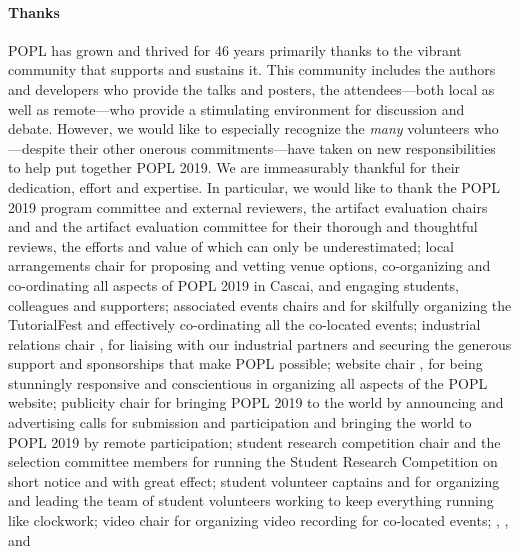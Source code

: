 \paragraph{Thanks}
%
POPL has grown and thrived for 46 years primarily thanks to
the vibrant community that supports and sustains it.
%
This community includes the authors and developers who
provide the talks and posters, the attendees---both local
as well as remote---who provide a stimulating environment
for discussion and debate.
%
However, we would like to especially recognize the \emph{many}
volunteers who---despite their other onerous commitments---have
taken on new responsibilities to help put together POPL 2019.
%
We are immeasurably thankful for their dedication, effort and expertise.
%
In particular, we would like to thank
%
the POPL 2019 program committee and external reviewers, 
%
the artifact evaluation chairs  and   
and the artifact evaluation committee for their
thorough and thoughtful reviews, the efforts and value of which can only be underestimated;
%
local arrangements chair  for proposing and vetting venue options, co-organizing and co-ordinating
all aspects of POPL 2019 in Cascai, and engaging students, colleagues and supporters;
%
associated events chairs  and  for skilfully organizing
the TutorialFest and effectively co-ordinating all the co-located events;
%
industrial relations chair , for liaising with our industrial
partners and securing the generous support and sponsorships that make POPL possible;
%
website chair , for being stunningly responsive 
and conscientious in organizing all aspects of the POPL website;
%
publicity chair  for bringing POPL 2019 to the world by announcing and advertising calls for
submission and participation and bringing the world to POPL 2019 by remote participation; 
%
student research competition chair  and the selection committee members for running the Student Research Competition on short notice and with great effect;
%
student volunteer captains  and  for organizing
and leading the team of student volunteers working to keep everything running like clockwork;
%
video chair  for organizing video recording for co-located events;
%
, ,
 and 
